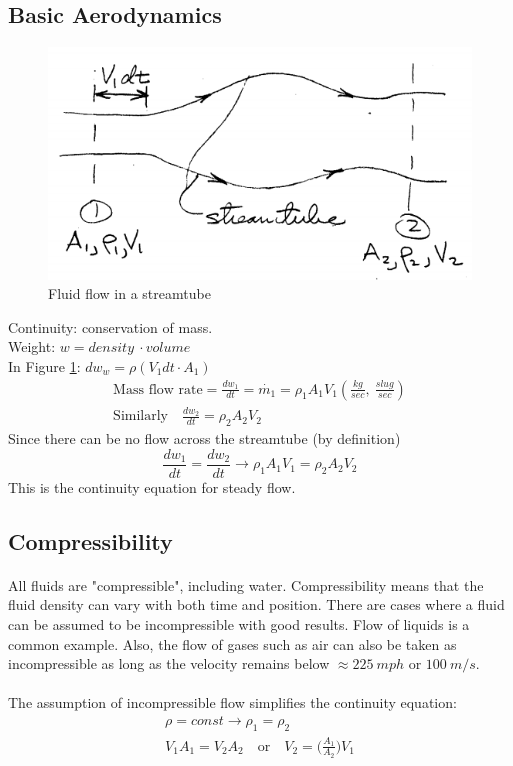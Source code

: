 \documentclass[draft=false, titlepage]{article}
\begin{document}
\subsection{Basic Aerodynamics}
\begin{figure}[ht]
	\centering
	\includegraphics[width=0.5\linewidth]{Figures/p3_streamtube.PNG}
	\caption{Fluid flow in a streamtube}
	\label{fig:p3_streamtube}
\end{figure}
Continuity: conservation of mass.\\
Weight: $w = density\ \cdot volume$\\
In Figure \ref{fig:p3_streamtube}: $dw_w = \rho (V_1 dt \cdot A_1)$
\begin{gather*}
\text{Mass flow rate} = \frac{dw_1}{dt} = \dot{m_1} = \rho_1 A_1 V_1 (\frac{kg}{sec},\ \frac{slug}{sec})\\
\text{Similarly} \quad \frac{dw_2}{dt} = \rho_2 A_2 V_2
\end{gather*}
Since there can be no flow across the streamtube (by definition)
\begin{equation*}
\frac{dw_1}{dt} = \frac{dw_2}{dt} \rightarrow \boxed{\rho_1A_1V_1 = \rho_2A_2V_2}
\end{equation*}
This is the continuity equation for steady flow.

\subsection{Compressibility}
\paragraph*{} All fluids are "compressible", including water. Compressibility means that the fluid density can vary with both time and position. There are cases where a fluid can be assumed to be incompressible with good results. Flow of liquids is a common example. Also, the flow of gases such as air can also be taken as incompressible as long as the velocity remains below $\approx 225\ mph$ or $100\ m/s$.
\paragraph*{} The assumption of incompressible flow simplifies the continuity equation:
\begin{gather*}
\rho = const \rightarrow \rho_1 = \rho_2\\
V_1A_1 = V_2A_2 \quad \text{or} \quad V_2 = \big(\frac{A_1}{A_2}\big)V_1
\end{gather*}
\end{document}
